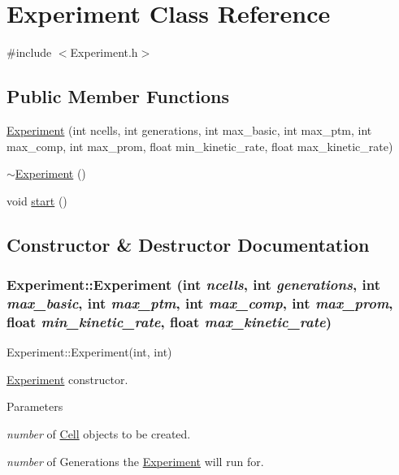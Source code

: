 \hypertarget{classExperiment}{
\section{Experiment Class Reference}
\label{classExperiment}
}


{\ttfamily \#include $<$Experiment.h$>$}\subsection*{Public Member Functions}
\begin{DoxyCompactItemize}
\item 
\hyperlink{classExperiment_a512095983765afc4096aa91a157ede49}{Experiment} (int ncells, int generations, int max\_\-basic, int max\_\-ptm, int max\_\-comp, int max\_\-prom, float min\_\-kinetic\_\-rate, float max\_\-kinetic\_\-rate)
\item 
\hyperlink{classExperiment_a96058d848040e45948bbb60623711da6}{$\sim$Experiment} ()
\item 
void \hyperlink{classExperiment_ab15fca04be9b7bcad65b264b23b4a499}{start} ()
\end{DoxyCompactItemize}


\subsection{Constructor \& Destructor Documentation}
\hypertarget{classExperiment_a512095983765afc4096aa91a157ede49}{
\subsubsection[{Experiment}]{\setlength{\rightskip}{0pt plus 5cm}Experiment::Experiment (int {\em ncells}, \/  int {\em generations}, \/  int {\em max\_\-basic}, \/  int {\em max\_\-ptm}, \/  int {\em max\_\-comp}, \/  int {\em max\_\-prom}, \/  float {\em min\_\-kinetic\_\-rate}, \/  float {\em max\_\-kinetic\_\-rate})}}
\label{classExperiment_a512095983765afc4096aa91a157ede49}
Experiment::Experiment(int, int)

\hyperlink{classExperiment}{Experiment} constructor.


\begin{DoxyParams}{Parameters}
\item[{\em number}]of \hyperlink{classCell}{Cell} objects to be created. \item[{\em number}]of Generations the \hyperlink{classExperiment}{Experiment} will run for. \end{DoxyParams}


